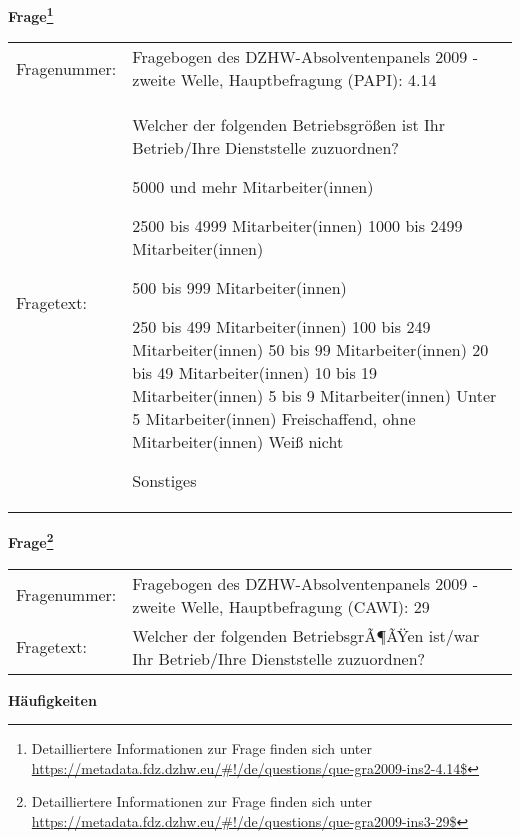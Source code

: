 				\vspace*{0.5cm}
                \noindent\textbf{Frage\footnote{Detailliertere Informationen zur Frage finden sich unter
		              \url{https://metadata.fdz.dzhw.eu/\#!/de/questions/que-gra2009-ins2-4.14$}}}\\
				\begin{tabularx}{\hsize}{@{}lX}
					Fragenummer: &
					  Fragebogen des DZHW-Absolventenpanels 2009 - zweite Welle, Hauptbefragung (PAPI):
					  4.14
 \\
					Fragetext: & Welcher der folgenden Betriebsgrößen ist Ihr Betrieb/Ihre Dienststelle zuzuordnen?\par  5000 und mehr Mitarbeiter(innen)\par  2500 bis 4999 Mitarbeiter(innen) 1000 bis 2499 Mitarbeiter(innen)\par  500 bis 999 Mitarbeiter(innen)\par  250 bis 499 Mitarbeiter(innen) 100 bis 249 Mitarbeiter(innen) 50 bis 99 Mitarbeiter(innen) 20 bis 49 Mitarbeiter(innen) 10 bis 19 Mitarbeiter(innen) 5 bis 9 Mitarbeiter(innen) Unter 5 Mitarbeiter(innen) Freischaffend, ohne Mitarbeiter(innen) Weiß nicht\par  Sonstiges \\
				\end{tabularx}
				\vspace*{0.5cm}
                \noindent\textbf{Frage\footnote{Detailliertere Informationen zur Frage finden sich unter
		              \url{https://metadata.fdz.dzhw.eu/\#!/de/questions/que-gra2009-ins3-29$}}}\\
				\begin{tabularx}{\hsize}{@{}lX}
					Fragenummer: &
					  Fragebogen des DZHW-Absolventenpanels 2009 - zweite Welle, Hauptbefragung (CAWI):
					  29
 \\
					Fragetext: & Welcher der folgenden BetriebsgrÃ¶ÃŸen ist/war Ihr Betrieb/Ihre Dienststelle zuzuordnen? \\
				\end{tabularx}





        		\vspace*{0.5cm}
                \noindent\textbf{Häufigkeiten}

